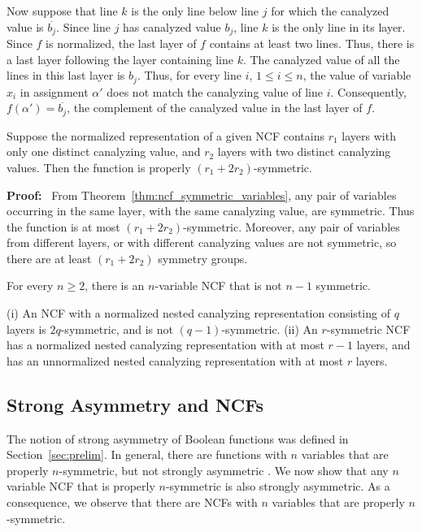 Now suppose that line $k$ is the only line below line $j$ for which
the canalyzed value is $\overline{b_j}$.  Since line $j$ has
canalyzed value $b_j$, line $k$ is the only line in its layer.
Since $f$ is normalized, the last layer of $f$ contains at least
two lines.  Thus, there is a last layer following the layer containing
line $k$.  The canalyzed value of all the lines in this last layer
is $b_j$.  Thus, for every line $i$, $1 \leq i \leq n$, the value
of variable $x_i$ in assignment $\alpha'$ does not match the
canalyzing value of line $i$.  Consequently, $f(\alpha') =
\overline{b_j}$, the complement of the canalyzed value in the last
layer of $f$.  \QED

\begin{theorem}\label{thm:ncf_r_symmetric}
Suppose the normalized representation of a given NCF contains 
$r_1$ layers with only one distinct canalyzing value,
and $r_2$ layers with two distinct canalyzing values.
Then the function is properly $(r_1 + 2 r_2)$-symmetric.
\end{theorem}

\noindent
\textbf{Proof:}~
From Theorem~\ref{thm:ncf_symmetric_variables}, 
any pair of variables occurring in the same layer, 
with the same canalyzing value, are symmetric.
Thus the function is at most $(r_1 + 2 r_2)$-symmetric.
Moreover, any pair of variables from different layers, or with different canalyzing values
are not symmetric, so there are at least $(r_1 + 2 r_2)$ symmetry groups.
\QED

\begin{corollary}\label{cor:ncf_not_rsymm}
For every $n \geq 2$, there is an $n$-variable NCF that is not $n-1$ symmetric.
\end{corollary}

\begin{corollary}\label{cor:ncf_r_symmetric_layers}
(i) An NCF with a normalized nested canalyzing representation consisting
of $q$ layers is $2q$-symmetric, and is not $(q-1)$-symmetric.
(ii) An $r$-symmetric NCF has a normalized nested canalyzing representation
with at most $r-1$ layers, and has an unnormalized nested canalyzing
representation with at most $r$ layers.  
\end{corollary}

\subsection{Strong Asymmetry and NCFs}
\label{sse:strong_asym_ncf}

The notion of strong asymmetry of Boolean functions was defined 
in Section~\ref{sec:prelim}.
In general, there are functions with $n$ variables that are properly
$n$-symmetric, but not strongly asymmetric \cite{KS-2000}.
We now show that any $n$ variable NCF that is properly $n$-symmetric
is also strongly asymmetric.
As a consequence, we observe that there are NCFs with $n$ variables
that are properly $n$-symmetric.


